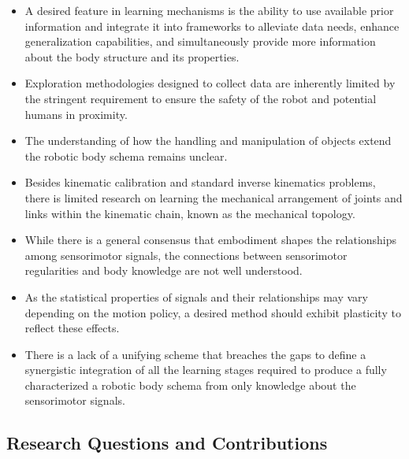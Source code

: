 \documentclass[12pt, a4paper]{article}
\begin{document}
\begin{itemize}
\item A desired feature in learning mechanisms is the ability to use available prior information and integrate it into frameworks to alleviate data needs, enhance generalization capabilities, and simultaneously provide more information about the body structure and its properties.

\item Exploration methodologies designed to collect data are inherently limited by the stringent requirement to ensure the safety of the robot and potential humans in proximity.

\item The understanding of how the handling and manipulation of objects extend the robotic body schema remains unclear.

\item Besides kinematic calibration and standard inverse kinematics problems, there is limited research on learning the mechanical arrangement of joints and links within the kinematic chain, known as the mechanical topology.

\item While there is a general consensus that embodiment shapes the relationships among sensorimotor signals, the connections between sensorimotor regularities and body knowledge are not well understood.

\item As the statistical properties of signals and their relationships may vary depending on the motion policy, a desired method should exhibit plasticity to reflect these effects.

\item There is a lack of a unifying scheme that breaches the gaps to define a synergistic integration of all the learning stages required to produce a fully characterized a robotic body schema from only knowledge about the sensorimotor signals.
	
\end{itemize}

\subsection*{Research Questions and Contributions}
\end{document}
